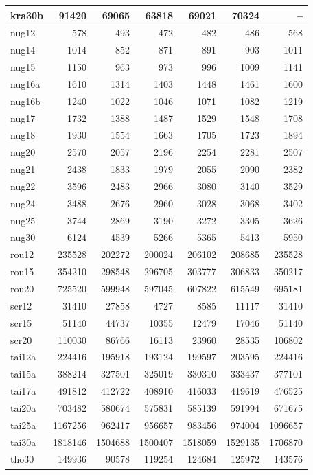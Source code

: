 \documentclass[10pt]{article}
\theoremstyle{remark}
\begin{document}
\begin{table}[p]
\begin{tabular}{lrrrrrr}
kra30b & 91420 & 69065 & 63818 & 69021 & 70324 & --\\
\midrule
nug12 & 578 & 493 & 472 & 482 & 486 & 568\\
nug14 & 1014 & 852 & 871 & 891 & 903 & 1011\\
nug15 & 1150 & 963 & 973 & 996 & 1009 & 1141\\
nug16a & 1610 & 1314 & 1403 & 1448 & 1461 & 1600\\
nug16b & 1240 & 1022 & 1046 & 1071 & 1082 & 1219\\
nug17 & 1732 & 1388 & 1487 & 1529 & 1548 & 1708\\
nug18 & 1930 & 1554 & 1663 & 1705 & 1723 & 1894\\
nug20 & 2570 & 2057 & 2196 & 2254 & 2281 & 2507\\
nug21 & 2438 & 1833 & 1979 & 2055 & 2090 & 2382\\
nug22 & 3596 & 2483 & 2966 & 3080 & 3140 & 3529\\
nug24 & 3488 & 2676 & 2960 & 3028 & 3068 & 3402\\
nug25 & 3744 & 2869 & 3190 & 3272 & 3305 & 3626\\
nug30 & 6124 & 4539 & 5266 & 5365 & 5413 & 5950\\
\midrule
rou12 & 235528 & 202272 & 200024 & 206102 & 208685 & 235528\\
rou15 & 354210 & 298548 & 296705 & 303777 & 306833 & 350217\\
rou20 & 725520 & 599948 & 597045 & 607822 & 615549 & 695181\\
\midrule
scr12 & 31410 & 27858 & 4727 & 8585 & 11117 & 31410\\
scr15 & 51140 & 44737 & 10355 & 12479 & 17046 & 51140\\
scr20 & 110030 & 86766 & 16113 & 23960 & 28535 & 106802\\
\midrule
tai12a & 224416 & 195918 & 193124 & 199597 & 203595 & 224416\\
tai15a & 388214 & 327501 & 325019 & 330310 & 333437 & 377101\\
tai17a & 491812 & 412722 & 408910 & 416033 & 419619 & 476525\\
tai20a & 703482 & 580674 & 575831 & 585139 & 591994 & 671675\\
tai25a & 1167256 & 962417 & 956657 & 983456 & 974004 & 1096657\\
tai30a & 1818146 & 1504688 & 1500407 & 1518059 & 1529135 & 1706870\\
\midrule
tho30 & 149936 & 90578 & 119254 & 124684 & 125972 & 143576\\
\bottomrule
\end{tabular}
\end{table}
\end{document}
